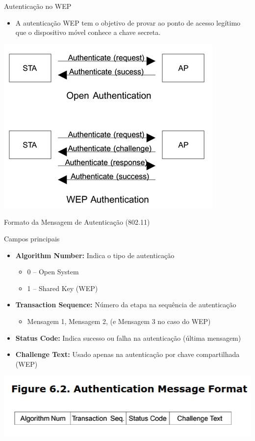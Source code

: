 \begin{frame}{Autenticação no WEP}
    \begin{itemize}
        \item A autenticação WEP tem o objetivo de provar ao ponto de acesso legítimo que o dispositivo móvel conhece a chave secreta.
    \end{itemize}

    \centering
    \includegraphics[width=0.55\linewidth]{Figuras/wep-auth.png}



\end{frame}




\begin{frame}{Formato da Mensagem de Autenticação (802.11)}
    \begin{block}{Campos principais}
        \begin{itemize}
            \item \textbf{Algorithm Number:} Indica o tipo de autenticação
                  \begin{itemize}
                      \item 0 – Open System
                      \item 1 – Shared Key (WEP)
                  \end{itemize}
            \item \textbf{Transaction Sequence:} Número da etapa na sequência de autenticação
                  \begin{itemize}
                      \item Mensagem 1, Mensagem 2, (e Mensagem 3 no caso do WEP)
                  \end{itemize}
            \item \textbf{Status Code:} Indica sucesso ou falha na autenticação (última mensagem)
            \item \textbf{Challenge Text:} Usado apenas na autenticação por chave compartilhada (WEP)
        \end{itemize}
    \end{block}



    \centering
    \includegraphics[width=0.55\linewidth]{Figuras/wep-authentication-message.png}



\end{frame}




